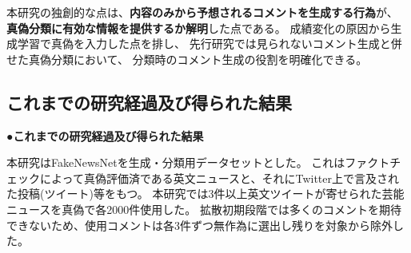 {	本研究の独創的な点は、\textbf{内容のみから予想されるコメントを生成する行為}が、
	\textbf{真偽分類に有効な情報を提供するか解明}した点である。
	成績変化の原因から生成学習で真偽を入力した点を排し、
	先行研究では見られないコメント生成と併せた真偽分類において、
	分類時のコメント生成の役割を明確化できる。
	


	\subsection{これまでの研究経過及び得られた結果}
	\noindent
	●\textbf{これまでの研究経過及び得られた結果}

	本研究はFakeNewsNet\cite{Shu2018FakeNewsNetAD, shu2017fake}を生成・分類用データセットとした。
	これはファクトチェックによって真偽評価済である英文ニュースと、それにTwitter上で言及された投稿(ツイート)等をもつ。
	本研究では3件以上英文ツイートが寄せられた芸能ニュースを真偽で各2000件使用した。
	拡散初期段階では多くのコメントを期待できないため、使用コメントは各3件ずつ無作為に選出し残りを対象から除外した。

}
